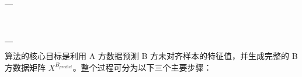 \vspace{-0.2cm} 
\begin{table}[H]
	\centering
	\renewcommand{\arraystretch}{1.0}
	{\songti \wuhao
		\begin{tabular}{p{\textwidth}}
			\toprule[1.5pt]
			\makecell[l]{\songti\wuhao  算法 4-1 纵向联邦半监督方法生成数据过程}\\
			\midrule[0.75pt]
			\makecell[l]{\wuhao \textbf{输入:} A方对齐数据集 $X_{al}^A$, 未标记数据集 $X_{nl}^A$,B 方特性相关性列表 $\mathcal{L}_B$}\\
			\makecell[l]{\wuhao \quad 对齐数据集样本数量 $n_{al}$，标记数据集的样本数量 $n_{nl}$，相关性阈值 $\tau$}\\
			\makecell[l]{\wuhao \textbf{输出:} $X^{B_{predict}}$: 最终通过预测方法生成的B方数据}\\
			\makecell[l]{\wuhao \textbf{Process:}}\\
			\makecell[l]{\wuhao 1: Initialize $X^{B_{predict}} = \emptyset$, $\mathcal{L}_B^{\text{predict}} = \{(\mu_q, \phi^B_q) \in \mathcal{L}_B \mid u_q > \tau\}$}\\
			\makecell[l]{\wuhao 2: \textbf{for} $(\mu_q, \phi^B_q) \in \mathcal{L}_B^{\text{predict}}$ \textbf{do}}\\
			\makecell[l]{\wuhao 3: \quad $X_{al}^{B_{predict}} = \{x_{i}^{B_{predict}}\}_{i=1}^{n_{al}}$}\\
			\makecell[l]{\wuhao 4: \quad $X_{nl}^{B_{predict}} = \{x_{i}^{B_{predict}}\}_{i=n_{al}+1}^{n_{al}+n_{nl}}$}\\
			\makecell[l]{\wuhao 5: \quad $p = \text{VFPU-M}(X_{al}^A, X_{nl}^A, X_{al}^{B_{predict}}, X_{nl}^{B_{predict}}, \phi^B_q)$}\\
			\makecell[l]{\wuhao 6: \quad $X^{B_{predict}} = X^{B_{predict}} \cup \{p\}$}\\
			\makecell[l]{\wuhao 7: \textbf{end for}}\\
			\makecell[l]{\wuhao 8: 得到 $X^{B_{predict}}$}\\
			\bottomrule[1.5pt]
		\end{tabular}
	}
	\label{tab:algo-vfpu}
\end{table}
\vspace{-0.56cm}

算法的核心目标是利用 A 方数据预测 B 方未对齐样本的特征值，并生成完整的 B 方数据矩阵 $X^{B_{predict}}$。整个过程可分为以下三个主要步骤：

